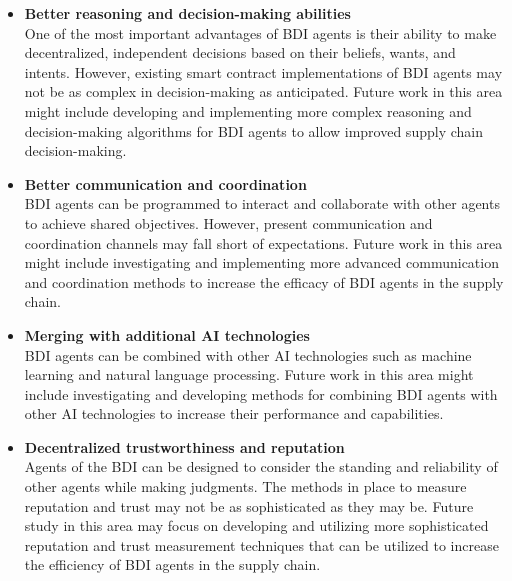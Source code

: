 \begin{itemize}
    \item \textbf{Better reasoning and decision-making abilities} \\ 
    One of the most important advantages of \ac{BDI} agents is their ability to make decentralized, independent decisions based on their beliefs, wants, and intents. However, existing smart contract implementations of \ac{BDI} agents may not be as complex in decision-making as anticipated. Future work in this area might include developing and implementing more complex reasoning and decision-making algorithms for \ac{BDI} agents to allow improved supply chain decision-making.

    \vspace{.5cm}
    
    \item \textbf{Better communication and coordination} \\ 
    \ac{BDI} agents can be programmed to interact and collaborate with other agents to achieve shared objectives. However, present communication and coordination channels may fall short of expectations. Future work in this area might include investigating and implementing more advanced communication and coordination methods to increase the efficacy of \ac{BDI} agents in the supply chain.

    \vspace{.5cm}
    
    \item \textbf{Merging with additional \ac{AI} technologies}\\ 
    \ac{BDI} agents can be combined with other \ac{AI} technologies such as machine learning and natural language processing. Future work in this area might include investigating and developing methods for combining \ac{BDI} agents with other \ac{AI} technologies to increase their performance and capabilities.

    \vspace{.5cm}
    
    \item \textbf{Decentralized trustworthiness and reputation} \\ 
    Agents of the \ac{BDI} can be designed to consider the standing and reliability of other agents while making judgments. The methods in place to measure reputation and trust may not be as sophisticated as they may be. Future study in this area may focus on developing and utilizing more sophisticated reputation and trust measurement techniques that can be utilized to increase the efficiency of \ac{BDI} agents in the supply chain.
    

\end{itemize}
